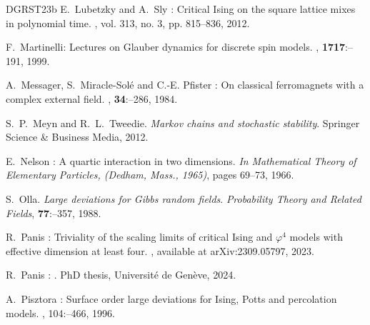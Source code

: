\documentclass[11pt,a4paper]{article}
\theoremstyle{definition}
\numberwithin{equation}{section}
\begin{document}
\begin{thebibliography}{DGRST23b}
E.~\bgroup\fonteauteurs\bgroup Lubetzky\egroup\egroup{} and A.~\bgroup\fonteauteurs\bgroup Sly\egroup\egroup{} :  
\newblock Critical Ising on the square lattice mixes in polynomial time.  
, vol. 313, no. 3, pp. 815--836, 2012.


F.~\bgroup\fonteauteurs\bgroup Martinelli\egroup\egroup{}:
\newblock Lectures on Glauber dynamics for discrete spin models.
, \textbf{1717}\string:--191, 1999.

A.~\bgroup\fonteauteurs\bgroup Messager\egroup\egroup{}, S.~\bgroup\fonteauteurs\bgroup Miracle-Sol{\'e}\egroup\egroup{} and C.-E. \bgroup\fonteauteurs\bgroup Pfister\egroup\egroup{} :
\newblock On classical ferromagnets with a complex external field.
, \textbf{34}\string:--286, 1984.

\bgroup\fonteauteurs\bgroup S.~P.~Meyn and R.~L.~Tweedie\egroup\egroup. 
\emph{Markov chains and stochastic stability}. 
Springer Science \& Business Media, 2012.

E.~\bgroup\fonteauteurs\bgroup Nelson\egroup\egroup{} :
\newblock A quartic interaction in two dimensions.
\newblock \emph{In} {\em Mathematical Theory of Elementary Particles, (Dedham, Mass., 1965)}, pages 69--73, 1966.

\bgroup\fonteauteurs\bgroup S.~Olla\egroup\egroup. 
\emph{Large deviations for Gibbs random fields}. 
\emph{Probability Theory and Related Fields}, \textbf{77}:--357, 1988.

R.~\bgroup\fonteauteurs\bgroup Panis\egroup\egroup{} :
\newblock Triviality of the scaling limits of critical {I}sing and $\varphi^4$ models with effective dimension at least four.
, available at arXiv:2309.05797, 2023.

R.~\bgroup\fonteauteurs\bgroup Panis\egroup\egroup{} :
.
\newblock PhD thesis, Université de Genève, 2024.

A.~\bgroup\fonteauteurs\bgroup Pisztora\egroup\egroup{} :
\newblock Surface order large deviations for {I}sing, {P}otts and percolation models.
, 104\string:--466, 1996.


\end{thebibliography}
\end{document}
